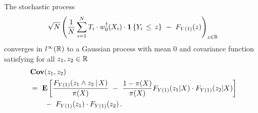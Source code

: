 \begin{ftheorem}
  \label{aa:mean:th}
The stochastic process
\begin{gather}
    \sqrt{N}
    \left( 
  \frac{1}{N}
    \sum_{i=1}^{N} 
    T_i
    \cdot
    w_0^\dagger(X_i)
    \cdot
    \mathbf{1}
    \left\{ Y_i\,\le\, z \right\}
    \ 
    -
    \ 
    F_{Y(1)}(z)
    \right)
    _{z\in\R}
    \,
  \end{gather}
  converges in
  $l^\infty(\mathbb{R})$
  to a Gaussian process with mean 0 and covariance function
  satisfying for all $z_1,z_2\in\mathbb{R}$
\begin{align}
  \label{cov:lp}
 \begin{split}
  &
  \mathbf{Cov}
  (z_1,z_2)
  \\
  &
  =\ 
  \E
  \left[ 
 \frac{
 F_{Y(1)}(z_1 \land z_2\,|\,X)
}{\pi(X)}
\ 
-
\ 
 \frac{1-\pi(X)}{\pi(X)}
 F_{Y(1)}(z_1|X)
 \cdot
 F_{Y(1)}(z_2|X)
  \right]
  \\
  &
  \qquad 
 -
 \ 
 F_{Y(1)}(z_1)
 \cdot
 F_{Y(1)}(z_2)
 \,.
 \end{split}
\end{align}
\end{ftheorem}


